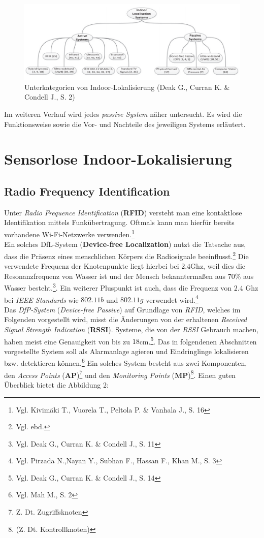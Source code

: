 \begin{figure}[H]
	\centering
	\includegraphics[scale=0.9]{pictures/indoor_loc}
	\caption{Unterkategorien von Indoor-Lokalisierung (Deak G.,  Curran K. \& Condell J., S. 2)}
\end{figure}

Im weiteren Verlauf wird jedes \textit{passive System} näher untersucht. Es wird die Funktionsweise sowie die Vor- und Nachteile des jeweiligen Systems erläutert.


\section{Sensorlose Indoor-Lokalisierung}
\subsection{Radio Frequency Identification}
Unter \textit{Radio Frequence Identification} (\textbf{RFID}) versteht man eine kontaktlose Identifikation mittels Funkübertragung. Oftmals kann man hierfür bereits vorhandene Wi-Fi-Netzwerke verwenden.\footnote{Vgl. Kivimäki T., Vuorela T., Peltola P. \& Vanhala J., S.  16} \\
Ein solches DfL-System (\textbf{Device-free Localization}) nutzt die Tatsache aus, dass die Präsenz eines menschlichen Körpers die Radiosignale beeinflusst.\footnote{Vgl. ebd.} Die verwendete Frequenz der Knotenpunkte liegt hierbei bei $2.4$Ghz, weil dies die Resonanzfrequenz von Wasser ist und der Mensch bekanntermaßen aus $70\%$ aus Wasser besteht.\footnote{Vgl. Deak G.,  Curran K. \& Condell J., S. 11}. Ein weiterer Pluspunkt ist auch, dass die Frequenz von $2.4$ Ghz bei \textit{IEEE Standards} wie $802.11b$ und $802.11g$ verwendet wird.\footnote{Vgl. Pirzada N.,Nayan Y., Subhan F., Hassan F., Khan M., S. 3}\\
Das \textit{DfP-System} (\textit{Device-free Passive}) auf Grundlage von \textit{RFID}, welches im Folgenden vorgestellt wird, misst die Änderungen von der erhaltenen \textit{Received Signal Strength Indication} (\textbf{RSSI}). Systeme, die von der \textit{RSSI} Gebrauch machen, haben meist eine Genauigkeit von bis zu $18$cm.\footnote{Vgl. Deak G.,  Curran K. \& Condell J., S. 14}. Das in folgendenen Abschnitten vorgestellte System soll als Alarmanlage agieren und Eindringlinge lokalisieren bzw. detektieren können.\footnote{Vgl. Mah M., S. 2} Ein solches System besteht aus zwei Komponenten, den \textit{Access Points} (\textbf{AP})\footnote{Z. Dt. Zugriffsknoten} und den \textit{Monitoring Points} (\textbf{MP})\footnote{(Z. Dt. Kontrollknoten)}. Einen guten Überblick bietet die Abbildung 2:\\

